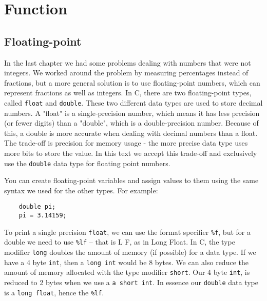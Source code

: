 
\setcounter{chapter}{2}
\chapter{Function}

\section{Floating-point}

In the last chapter we had some problems dealing with numbers
that were not integers.  We worked around the problem by measuring
percentages instead of fractions, but a more general solution is
to use floating-point numbers, which can represent fractions
as well as integers.  In C, there are two floating-point types,
called {\tt float} and {\tt double}.  These two different data types
are  used to store decimal numbers. A "float" is a single-precision number, 
which means it has less precision (or fewer digits) than a "double", 
which is a double-precision number. Because of this,
a double is more accurate when dealing with decimal numbers than a float. 
The trade-off is precision for memory usage - the more precise data type uses more bits
to store the value. In this text we accept this trade-off  and exclusively use the
{\tt double} data type for floating point numbers.  


You can create floating-point variables and assign values to them
using the same syntax we used for the other types.  For example:

\begin{verbatim}
    double pi;
    pi = 3.14159;
\end{verbatim}
%

To print a single precision {\tt float}, we can use the format specifier {\tt \%f}, 
but for a double we need to use {\tt \%lf} -- that is L F, as in Long Float.  
In C, the type modifier {\tt long} doubles the amount of memory (if possible) for a data type. 
If we have a 4 byte {\tt int}, then a {\tt long int} would be 8 bytes. 
We can also reduce the amount of memory allocated with the type modifier {\tt short}.
Our 4 byte {\tt int}, is reduced to 2 bytes when we use a {\tt a short int}.
In essence our {\tt double} data type is a {\tt long float}, hence the {\tt \%lf}.

